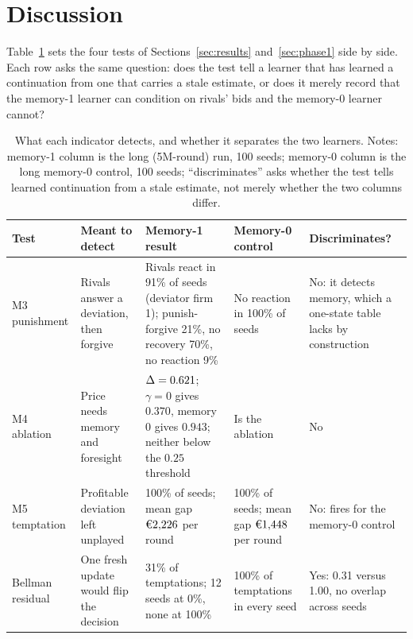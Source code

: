 \section{Discussion}\label{sec:discussion}

Table~\ref{tab:indicators-summary} sets the four tests of Sections~\ref{sec:results} and~\ref{sec:phase1} side by side. Each row asks the same question: does the test tell a learner that has learned a continuation from one that carries a stale estimate, or does it merely record that the memory-1 learner can condition on rivals' bids and the memory-0 learner cannot?

\begin{table}[t]
\caption{What each indicator detects, and whether it separates the two learners. Notes: memory-1 column is the long (5M-round) run, 100 seeds; memory-0 column is the long memory-0 control, 100 seeds; ``discriminates'' asks whether the test tells learned continuation from a stale estimate, not merely whether the two columns differ.}
\label{tab:indicators-summary}
\centering
\footnotesize
\setlength{\tabcolsep}{4pt}
\begin{tabular}{p{1.6cm} p{3.2cm} p{3.6cm} p{3.0cm} p{2.9cm}}
\toprule
Test & Meant to detect & Memory-1 result & Memory-0 control & Discriminates? \\
\midrule
M3 punishment & Rivals answer a deviation, then forgive & Rivals react in 91\% of seeds (deviator firm 1); punish-forgive 21\%, no recovery 70\%, no reaction 9\% & No reaction in 100\% of seeds & No: it detects memory, which a one-state table lacks by construction \\
M4 ablation & Price needs memory and foresight & $\Delta = 0.621$; $\gamma = 0$ gives $0.370$, memory 0 gives $0.943$; neither below the $0.25$ threshold & Is the ablation & No \\
M5 temptation & Profitable deviation left unplayed & 100\% of seeds; mean gap $\eur{2{,}226}$ per round & 100\% of seeds; mean gap $\eur{1{,}448}$ per round & No: fires for the memory-0 control \\
Bellman residual & One fresh update would flip the decision & 31\% of temptations; 12 seeds at 0\%, none at 100\% & 100\% of temptations in every seed & Yes: 0.31 versus 1.00, no overlap across seeds \\
\bottomrule
\end{tabular}
\end{table}

